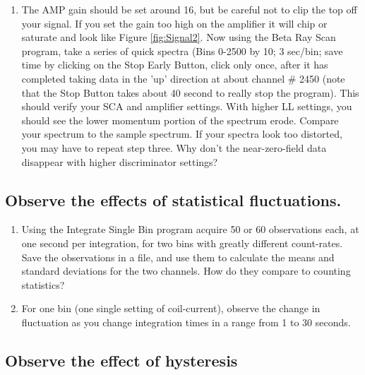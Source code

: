 \documentclass{../lab}
\begin{document}
\begin{enumerate}
    \item The AMP gain should be set around 16, but be careful not to clip the top off your signal. If you set the gain too high on the amplifier it will chip or saturate and look like Figure \ref{fig:Signal2}. Now using the Beta Ray Scan program, take a series of quick spectra (Bins 0-2500 by 10; 3 sec/bin; save time by clicking on the Stop Early Button, click only once, after it has completed taking data in the 'up' direction at about channel \# 2450 (note that the Stop Button takes about 40 second to really stop the program). This should verify your SCA and amplifier settings. With higher LL settings, you should see the lower momentum portion of the spectrum erode. Compare your spectrum to the sample spectrum. If your spectra look too distorted, you may have to repeat step three. Why don't the near-zero-field data disappear with higher discriminator settings?
\end{enumerate}

\subsection{Observe the effects of statistical fluctuations.}

\begin{enumerate}
    \item Using the Integrate Single Bin program acquire 50 or 60 observations each, at one second per integration, for two bins with greatly different count-rates. Save the observations in a file, and use them to calculate the means and standard deviations for the two channels. How do they compare to counting statistics?

    \item For one bin (one single setting of coil-current), observe the change in fluctuation as you change integration times in a range from 1 to 30 seconds.
    

\end{enumerate}

\subsection{Observe the effect of hysteresis}
\end{document}
